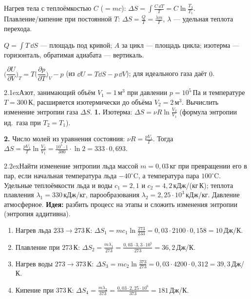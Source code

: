 \begin{basics}
Нагрев тела с теплоёмкостью $C$ ($=mc$): $\Delta S=\int\frac{C\,\dd T}{T}=C\ln\frac{T_2}{T_1}$.
\\Плавление/кипение при постоянной $T$: $\Delta S=\frac{Q}{T}=\frac{\lambda m}{T}$, $\lambda$ — удельная теплота перехода.

$Q=\int T\,\dd S$ — площадь под кривой; $A$ за цикл — площадь цикла; изотерма — горизонталь, обратимая адиабата — вертикаль.

$\Big(\dfrac{\partial U}{\partial V}\Big)_T=T\Big(\dfrac{\partial p}{\partial T}\Big)_V-p$ (из $\dd U=T\dd S-p\,\dd V$); для идеального газа даёт $0$.
\end{basics}

\begin{problem}{2.1}{ex}{Азот, занимающий объём $V_1=1$\,м$^3$ при давлении $p=10^5$\,Па и температуре $T=300$\,К, расширяется изотермически
до объёма $V_2=2$\,м$^3$. Вычислить изменение энтропии газа $\Delta S$.}
\textbf{1.} Изотерма: $\Delta S=\nu R\ln\frac{V_2}{V_1}$ (формула энтропии ид.\ газа при $T_2=T_1$).

\textbf{2.} Число молей из уравнения состояния: $\nu R=\frac{pV_1}{T}$. Тогда
$\Delta S=\frac{pV_1}{T}\ln\frac{V_2}{V_1}=\frac{10^5\cdot1}{300}\cdot\ln2=333\cdot0{,}693$.
\end{problem}

\begin{problem}{2.2}{ex}{Найти изменение энтропии льда массой $m=0{,}03$\,кг при превращении его в пар, если начальная температура льда
$-40^\circ$C, а температура пара $100^\circ$C. Удельные теплоёмкости льда и воды $c_1=2{,}1$ и $c_2=4{,}2$\,кДж/(кг\,К);
теплота плавления $\lambda_1=330$\,кДж/кг, парообразования $\lambda_2=2{,}25\cdot10^3$\,кДж/кг. Давление атмосферное.}
\textbf{Идея:} разбить процесс на этапы и сложить изменения энтропии (энтропия аддитивна).
\begin{enumerate}
\item Нагрев льда $233\to273$\,К: $\Delta S_1=mc_1\ln\frac{273}{233}=0{,}03\cdot2100\cdot0{,}158=10$\,Дж/К.
\item Плавление при $273$\,К: $\Delta S_2=\frac{m\lambda_1}{273}=\frac{0{,}03\cdot3{,}3\cdot10^5}{273}=36{,}2$\,Дж/К.
\item Нагрев воды $273\to373$\,К: $\Delta S_3=mc_2\ln\frac{373}{273}=0{,}03\cdot4200\cdot0{,}312=39{,}3$\,Дж/К.
\item Кипение при $373$\,К: $\Delta S_4=\frac{m\lambda_2}{373}=\frac{0{,}03\cdot2{,}25\cdot10^6}{373}=181$\,Дж/К.
\end{enumerate}
\end{problem}

